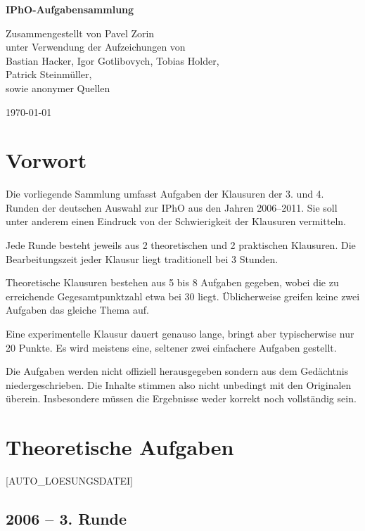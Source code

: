 \def \envfinal {}


\frontmatter
\begin{center}
{\HUGE \bfseries IPhO-Aufgabensammlung}

\vspace{1cm}

{\large Zusammengestellt von Pavel Zorin\\
unter Verwendung der Aufzeichungen von\\
Bastian Hacker, Igor Gotlibovych, Tobias Holder,\\
Patrick Steinmüller,\\
sowie anonymer Quellen}

\vspace{0.5cm}
\today
\end{center}
\tableofcontents

\chapter{Vorwort}
Die vorliegende Sammlung umfasst Aufgaben der Klausuren der 3. und 4. Runden der deutschen Auswahl zur IPhO aus den Jahren 2006--2011. Sie soll unter anderem einen Eindruck von der Schwierigkeit der Klausuren vermitteln.

Jede Runde besteht jeweils aus 2 theoretischen und 2 praktischen Klausuren. Die Bearbeitungszeit jeder Klausur liegt traditionell bei 3 Stunden.

Theoretische Klausuren bestehen aus 5 bis 8 Aufgaben gegeben, wobei die zu erreichende Gegesamtpunktzahl etwa bei 30 liegt. Üblicherweise greifen keine zwei Aufgaben das gleiche Thema auf.

Eine experimentelle Klausur dauert genauso lange, bringt aber typischerwise nur 20 Punkte. Es wird meistens eine, seltener zwei einfachere Aufgaben gestellt.

Die Aufgaben werden nicht offiziell herausgegeben sondern aus dem Gedächtnis niedergeschrieben. Die Inhalte stimmen also nicht unbedingt mit den Originalen überein. Insbesondere müssen die Ergebnisse weder korrekt noch vollständig sein.

\mainmatter
\pagestyle{plain}
\chapter{Theoretische Aufgaben}

[AUTO_LOESUNGSDATEI]
\section{2006 -- 3. Runde}


